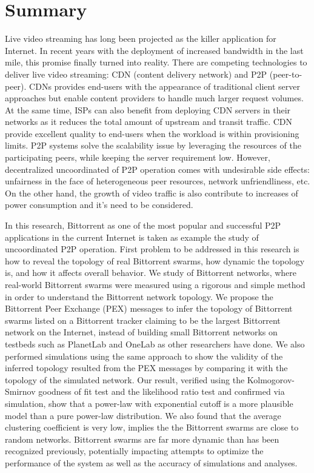 
\chapter*{Summary}

Live video streaming has long been projected as the killer application for Internet.  
In recent years with the deployment of increased bandwidth in the last mile, this promise finally turned into reality.
There are competing technologies to deliver live video streaming:  CDN (content delivery network) and P2P (peer-to-peer).
CDNs provides end-users with the appearance of traditional client server approaches but enable content providers to handle much larger request volumes.
At the same time, ISPs can also benefit from deploying CDN servers in their networks as it reduces the total amount of upstream and transit traffic. 
CDN provide excellent quality to end-users when the workload is within provisioning limits.
P2P systems solve the scalability issue by leveraging the resources of the participating peers, while keeping the server requirement low.
However, decentralized uncoordinated of P2P operation comes with undesirable side effects: unfairness in the face of heterogeneous peer resources, network unfriendliness, etc. 
On the other hand, the growth of video traffic is also contribute to increases of power consumption and it's need to be considered.

In this research, Bittorrent as one of the most popular and successful P2P applications in the current Internet is taken as example the study of uncoordinated P2P operation.
First problem to be addressed in this research is how to reveal the topology of real Bittorrent swarms, how dynamic the topology is, and how it affects overall behavior.
We study of Bittorrent networks, where real-world Bittorrent swarms were measured using a rigorous and simple method in order to understand the Bittorrent network topology. 
We propose the Bittorrent Peer Exchange (PEX) messages to infer the topology of Bittorrent swarms listed on a Bittorrent tracker claiming to be the largest Bittorrent network on the Internet, instead of building small Bittorrent networks on testbeds such as PlanetLab and OneLab as other researchers have done. 
We also performed simulations using the same approach to show the validity of the inferred topology  resulted from the PEX messages by comparing it with the topology of the simulated network.
Our result, verified using the Kolmogorov-Smirnov goodness of fit test and the likelihood ratio test and confirmed via simulation, show that a power-law with exponential cutoff is a more plausible model than a pure power-law distribution.  
We also found that the average clustering coefficient is very low, implies the the Bittorrent swarms are close to random networks.  
Bittorrent swarms are far more dynamic than has been recognized previously, potentially impacting attempts to optimize the performance of the system as well as the accuracy of simulations and analyses. 

